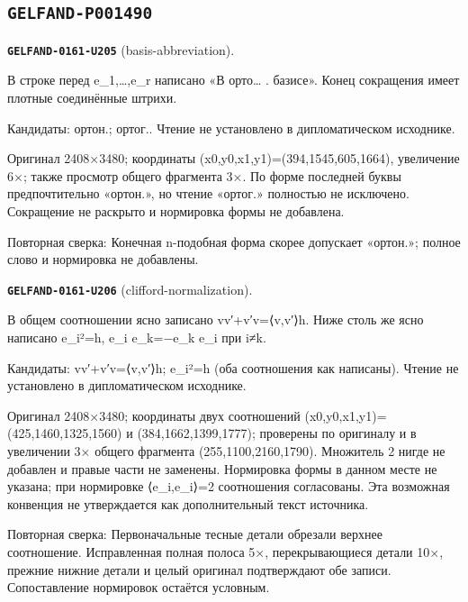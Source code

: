 \subsection*{\texttt{GELFAND-P001490}}
\par\noindent\leavevmode{}\label{GELFAND-0161-U205}\label{GELFAND-P001490:basis-abbreviation}\textbf{\texttt{GELFAND-0161-U205}} (basis-abbreviation).\nopagebreak[4]\par
В строке перед e\_1,…,e\_r написано «В орто… . базисе». Конец сокращения имеет плотные соединённые штрихи.\par
Кандидаты: ортон.; ортог.. Чтение не установлено в дипломатическом исходнике.\par
Оригинал 2408×3480; координаты (x0,y0,x1,y1)=(394,1545,605,1664), увеличение 6×; также просмотр общего фрагмента 3×. По форме последней буквы предпочтительно «ортон.», но чтение «ортог.» полностью не исключено. Сокращение не раскрыто и нормировка формы не добавлена.\par
Повторная сверка: Конечная n-подобная форма скорее допускает «ортон.»; полное слово и нормировка не добавлены.\par\medskip
\par\noindent\leavevmode{}\label{GELFAND-0161-U206}\label{GELFAND-P001490:clifford-normalization}\textbf{\texttt{GELFAND-0161-U206}} (clifford-normalization).\nopagebreak[4]\par
В общем соотношении ясно записано vv′+v′v=⟨v,v′⟩h. Ниже столь же ясно написано e\_i²=h, e\_i e\_k=−e\_k e\_i при i≠k.\par
Кандидаты: vv′+v′v=⟨v,v′⟩h; e\_i²=h (оба соотношения как написаны). Чтение не установлено в дипломатическом исходнике.\par
Оригинал 2408×3480; координаты двух соотношений (x0,y0,x1,y1)=(425,1460,1325,1560) и (384,1662,1399,1777); проверены по оригиналу и в увеличении 3× общего фрагмента (255,1100,2160,1790). Множитель 2 нигде не добавлен и правые части не заменены. Нормировка формы в данном месте не указана; при нормировке ⟨e\_i,e\_i⟩=2 соотношения согласованы. Эта возможная конвенция не утверждается как дополнительный текст источника.\par
Повторная сверка: Первоначальные тесные детали обрезали верхнее соотношение. Исправленная полная полоса 5×, перекрывающиеся детали 10×, прежние нижние детали и целый оригинал подтверждают обе записи. Сопоставление нормировок остаётся условным.\par\medskip
